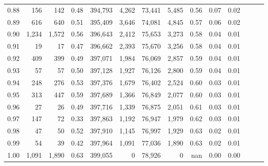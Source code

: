 \begin{tabular}{rrrrrrrrrrrrrr}
0.88 &     156 &    142 &  0.48 &  394,793 &    4,262 &  73,441 &   5,485 &  0.56 &  0.07 &      0.02 \\
0.89 &     616 &    640 &  0.51 &  395,409 &    3,646 &  74,081 &   4,845 &  0.57 &  0.06 &      0.02 \\
0.90 &   1,234 &  1,572 &  0.56 &  396,643 &    2,412 &  75,653 &   3,273 &  0.58 &  0.04 &      0.01 \\
0.91 &      19 &     17 &  0.47 &  396,662 &    2,393 &  75,670 &   3,256 &  0.58 &  0.04 &      0.01 \\
0.92 &     409 &    399 &  0.49 &  397,071 &    1,984 &  76,069 &   2,857 &  0.59 &  0.04 &      0.01 \\
0.93 &      57 &     57 &  0.50 &  397,128 &    1,927 &  76,126 &   2,800 &  0.59 &  0.04 &      0.01 \\
0.94 &     248 &    276 &  0.53 &  397,376 &    1,679 &  76,402 &   2,524 &  0.60 &  0.03 &      0.01 \\
0.95 &     313 &    447 &  0.59 &  397,689 &    1,366 &  76,849 &   2,077 &  0.60 &  0.03 &      0.01 \\
0.96 &      27 &     26 &  0.49 &  397,716 &    1,339 &  76,875 &   2,051 &  0.61 &  0.03 &      0.01 \\
0.97 &     147 &     72 &  0.33 &  397,863 &    1,192 &  76,947 &   1,979 &  0.62 &  0.03 &      0.01 \\
0.98 &      47 &     50 &  0.52 &  397,910 &    1,145 &  76,997 &   1,929 &  0.63 &  0.02 &      0.01 \\
0.99 &      54 &     39 &  0.42 &  397,964 &    1,091 &  77,036 &   1,890 &  0.63 &  0.02 &      0.01 \\
1.00 &   1,091 &  1,890 &  0.63 &  399,055 &        0 &  78,926 &       0 &   nan &  0.00 &      0.00 \\
\bottomrule
\end{tabular}
